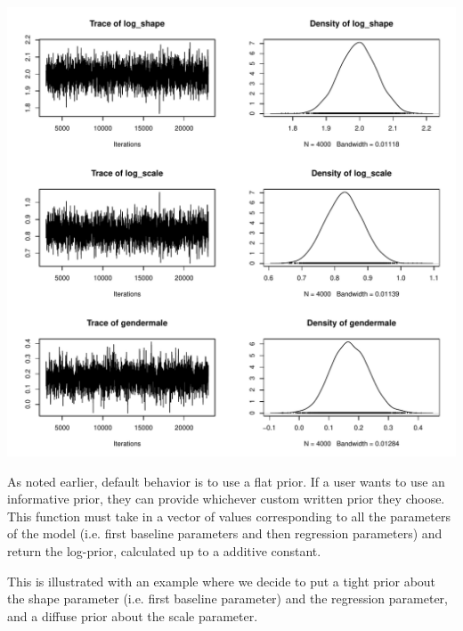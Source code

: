 \documentclass[a4paper]{article}
\begin{document}
\begin{Schunk}
\end{Schunk}
\includegraphics{icenReg-018}

As noted earlier, default behavior is to use a flat prior. If a user wants to use an informative prior, they can provide whichever custom written prior they choose. This function must take in a vector of values corresponding to all the parameters of the model (i.e. first baseline parameters and then regression parameters) and return the log-prior, calculated up to a additive constant. 

This is illustrated with an example where we decide to put a tight prior about the shape parameter (i.e. first baseline parameter) and the regression parameter, and a diffuse prior about the scale parameter. 
\end{document}
